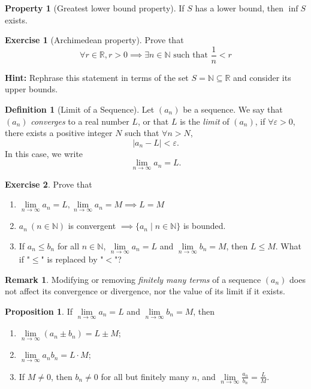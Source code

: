 \documentclass{article}
\theoremstyle{definition}
\newtheorem{proposition}{Proposition}
\newtheorem{definition}{Definition}
\newtheorem{remark}{Remark}
\newtheorem{property}{Property}
\newtheorem{exercise}{Exercise}
\begin{document}
\begin{property}[Greatest lower bound property]
    If $S$ has a lower bound, then $\inf S$ exists.
\end{property}

\begin{exercise}[Archimedean property] 
    Prove that
    $$\forall r \in \mathbb{R}, r>0 \implies \exists n \in \mathbb{N} \text{ such that } \frac{1}{n} < r$$
\end{exercise}

\textbf{Hint:} Rephrase this statement in terms of the set $S = \mathbb{N} \subseteq \mathbb{R}$ 
and consider its upper bounds.

\begin{definition}[Limit of a Sequence]
Let $(a_n)$ be a sequence. We say that $(a_n)$ \emph{converges} to a real number $L$, or that $L$ is the \emph{limit} of $(a_n)$, if $\forall \varepsilon > 0$, there exists a positive integer $N$ such that $\forall n > N$,
\[
|a_n - L| < \varepsilon.
\]
In this case, we write
\[
\lim_{n \to \infty} a_n = L.
\]
\end{definition}

\begin{exercise}\label{e3}
    Prove that
    \begin{enumerate}
        \item $\lim\limits_{n \to \infty} a_n = L, \lim\limits_{n \to \infty} a_n = M \implies L=M$
        \item $a_n\ (n\in \mathbb{N})$ is convergent $\implies \{a_n\mid n \in \mathbb{N}\}$ is bounded.
        \item If $a_n\leq b_n$ for all $n\in \mathbb{N}$, $\lim\limits_{n\to \infty} a_n =L$ and $\lim\limits_{n\to \infty} b_n=M$, then $L\leq M$.
            What if "$\leq$" is replaced by "$<$"?
    \end{enumerate}
\end{exercise}

\begin{remark}
    Modifying or removing \emph{finitely many terms} of a sequence $(a_n)$ does not affect its convergence or divergence, nor the value of its limit if it exists.
\end{remark}

\begin{proposition}
    If $\lim\limits_{n\to \infty}a_n=L$ and $\lim\limits_{n\to \infty}b_n=M$, then
    \begin{enumerate}
        \item $\lim\limits_{n\to \infty}(a_n\pm b_n)=L\pm M$;
        \item $\lim\limits_{n\to \infty}a_n b_n=L\cdot M$;
        \item If $M\neq 0$, then $b_n \neq 0$ for all but finitely many $n$, and $\lim\limits_{n\to \infty}\frac{a_n}{b_n}=\frac{L}{M}$.
    \end{enumerate}
\end{proposition}
\end{document}
